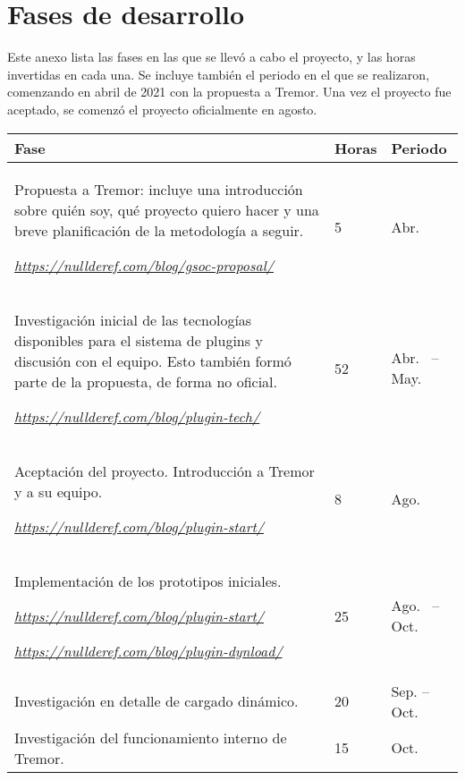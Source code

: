 \chapter{Fases de desarrollo}\label{annex:hours}

Este anexo lista las fases en las que se llevó a cabo el proyecto, y las horas
invertidas en cada una. Se incluye también el periodo en el que se realizaron,
comenzando en abril de 2021 con la propuesta a Tremor. Una vez el proyecto fue
aceptado, se comenzó el proyecto oficialmente en agosto.

\begin{longtable}[H]
\def\arraystretch{1.5}
\centering
\begin{tabular}{| M{9.9cm} | P{1.3cm} | P{3.5cm} |}
\hline
\textbf{Fase}
    & \textbf{Horas}
    & \textbf{Periodo} \\

\hline
Propuesta a Tremor: incluye una introducción sobre quién soy, qué proyecto
quiero hacer y una breve planificación de la metodología a seguir.

\emph{\url{https://nullderef.com/blog/gsoc-proposal/}}
    & 5
    & Abr.~ \\

\hline
Investigación inicial de las tecnologías disponibles para el sistema de
plugins y discusión con el equipo. Esto también formó parte de la propuesta, de
forma no oficial.

\emph{\url{https://nullderef.com/blog/plugin-tech/}}
    & 52
    & Abr.~ -- May.~ \\

\hline
Aceptación del proyecto. Introducción a Tremor y a su equipo.

\emph{\url{https://nullderef.com/blog/plugin-start/}}
    & 8
    & Ago.~ \\

\hline
Implementación de los prototipos iniciales.

\emph{\url{https://nullderef.com/blog/plugin-start/}}

\emph{\url{https://nullderef.com/blog/plugin-dynload/}}
    & 25
    & Ago.~ -- Oct.~ \\

\hline
Investigación en detalle de cargado dinámico.
    & 20
    & Sep. -- Oct.~ \\

\hline
Investigación del funcionamiento interno de Tremor.
    & 15
    & Oct.~ \\


\end{tabular}
\end{longtable}
